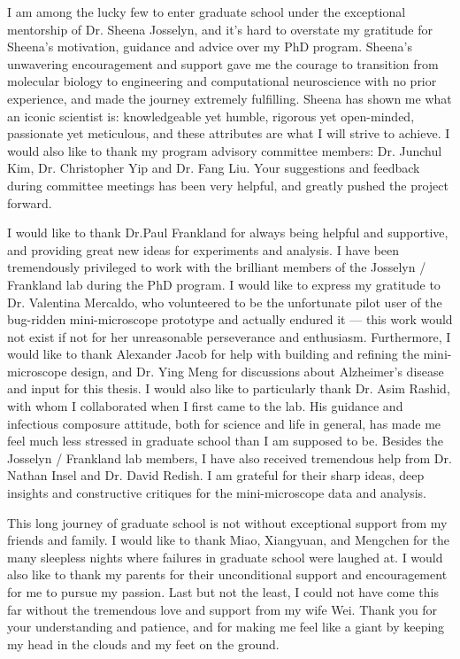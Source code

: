 I am among the lucky few to enter graduate school under the exceptional mentorship of Dr. Sheena Josselyn, and it's hard to overstate my gratitude for Sheena's motivation, guidance and advice over my PhD program. Sheena's unwavering encouragement and support gave me the courage to transition from molecular biology to engineering and computational neuroscience with no prior experience, and made the journey extremely fulfilling. Sheena has shown me what an iconic scientist is: knowledgeable yet humble, rigorous yet open-minded, passionate yet meticulous, and these attributes are what I will strive to achieve. I would also like to thank my program advisory committee members: Dr. Junchul Kim, Dr. Christopher Yip and Dr. Fang Liu. Your suggestions and feedback during committee meetings has been very helpful, and greatly pushed the project forward. 

I would like to thank Dr.Paul Frankland for always being helpful and supportive, and providing great new ideas for experiments and analysis. I have been tremendously privileged to work with the brilliant members of the Josselyn \slash{} Frankland lab during the PhD program. I would like to express my gratitude to Dr. Valentina Mercaldo, who volunteered to be the unfortunate pilot user of the bug-ridden mini-microscope prototype and actually endured it --- this work would not exist if not for her unreasonable perseverance and enthusiasm. Furthermore, I would like to thank Alexander Jacob for help with building and refining the mini-microscope design, and Dr. Ying Meng for discussions about Alzheimer's disease and input for this thesis. I would also like to particularly thank Dr. Asim Rashid, with whom I collaborated when I first came to the lab. His guidance and infectious composure  attitude, both for science and life in general, has made me feel much less stressed in graduate school than I am supposed to be. Besides the Josselyn \slash{} Frankland lab members, I have also received tremendous help from Dr. Nathan Insel and Dr. David Redish. I am grateful for their sharp ideas, deep insights and constructive critiques for the mini-microscope data and analysis. 

This long journey of graduate school is not without exceptional support from my friends and family.  I would like to thank Miao, Xiangyuan, and Mengchen for the many sleepless nights where failures in graduate school were laughed at. I would also like to thank my parents for their unconditional support and encouragement for me to pursue my passion. Last but not the least, I could not have come this far without the tremendous love and support from my wife Wei. Thank you for your understanding and patience, and for making me feel like a giant by keeping my head in the clouds and my feet on the ground. 
